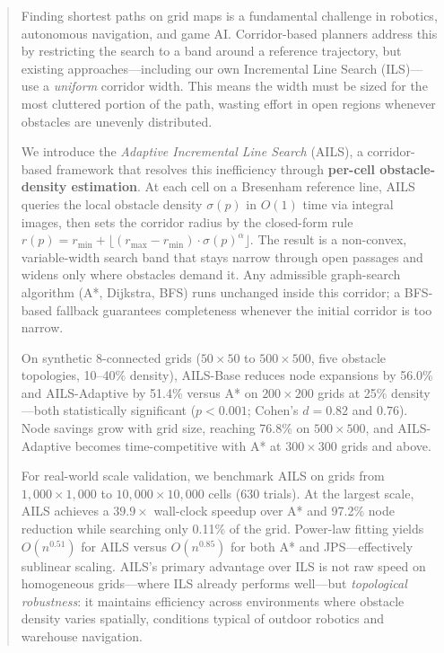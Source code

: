\documentclass[journal]{IEEEtran}
\begin{document}
\begin{abstract}
Finding shortest paths on grid maps is a fundamental challenge in robotics, autonomous navigation, and game AI.
Corridor-based planners address this by restricting the search to a band around a reference trajectory, but existing approaches---including our own Incremental Line Search (ILS)---use a \emph{uniform} corridor width.
This means the width must be sized for the most cluttered portion of the path, wasting effort in open regions whenever obstacles are unevenly distributed.

We introduce the \emph{Adaptive Incremental Line Search} (AILS), a corridor-based framework that resolves this inefficiency through \textbf{per-cell obstacle-density estimation}.
At each cell on a Bresenham reference line, AILS queries the local obstacle density $\sigma(p)$ in $O(1)$ time via integral images, then sets the corridor radius by the closed-form rule $r(p) = r_{\min} + \lfloor (r_{\max} - r_{\min}) \cdot \sigma(p)^{\alpha} \rfloor$.
The result is a non-convex, variable-width search band that stays narrow through open passages and widens only where obstacles demand it.
Any admissible graph-search algorithm (A*, Dijkstra, BFS) runs unchanged inside this corridor; a BFS-based fallback guarantees completeness whenever the initial corridor is too narrow.

On synthetic 8-connected grids ($50{\times}50$ to $500{\times}500$, five obstacle topologies, 10--40\% density), AILS-Base reduces node expansions by 56.0\% and AILS-Adaptive by 51.4\% versus A* on $200{\times}200$ grids at 25\% density---both statistically significant ($p < 0.001$; Cohen's $d = 0.82$ and $0.76$).
Node savings grow with grid size, reaching 76.8\% on $500{\times}500$, and AILS-Adaptive becomes time-competitive with A* at $300{\times}300$ grids and above.

For real-world scale validation, we benchmark AILS on grids from $1{,}000{\times}1{,}000$ to $10{,}000{\times}10{,}000$ cells (630 trials).
At the largest scale, AILS achieves a $39.9{\times}$ wall-clock speedup over A* and 97.2\% node reduction while searching only 0.11\% of the grid.
Power-law fitting yields $O(n^{0.51})$ for AILS versus $O(n^{0.85})$ for both A* and JPS---effectively sublinear scaling.
AILS's primary advantage over ILS is not raw speed on homogeneous grids---where ILS already performs well---but \emph{topological robustness}: it maintains efficiency across environments where obstacle density varies spatially, conditions typical of outdoor robotics and warehouse navigation.
\end{abstract}
\end{document}
